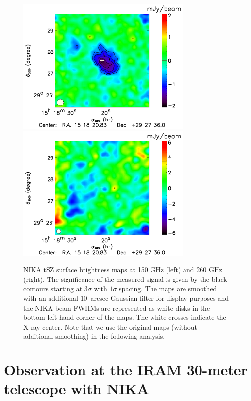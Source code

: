 \documentclass[traditabstract]{aa}
\begin{document}
\begin{figure}[h]
\centering
\includegraphics[height=6.8cm]{PSZ1G045_map_2mm_for_paper.pdf}
\includegraphics[height=6.8cm]{PSZ1G045_map_1mm_for_paper.pdf}
\caption{{\footnotesize NIKA tSZ surface brightness maps at 150 GHz (left) and 260 GHz (right). The significance of the measured signal is given by the black contours starting at $3\sigma$ with $1\sigma$ spacing. The maps are smoothed with an additional 10~arcsec Gaussian filter for display purposes and the NIKA beam FWHMs are represented as  white disks in the bottom left-hand corner of the maps. The white crosses indicate the X-ray center. Note that we use the original maps (without additional smoothing) in the following analysis.}}
\label{fig:brightness_map}
\end{figure}
\section{Observation at the IRAM 30-meter telescope with NIKA}\label{sec:Observations}
\end{document}
